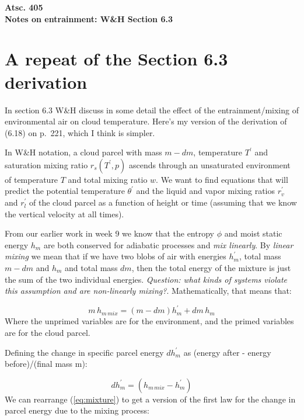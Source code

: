 \documentclass[12pt]{article}
\begin{document}
\begin{center}
{\bf
Atsc. 405\\
Notes on entrainment: W\&H Section 6.3\\
 }
\end{center}


\section{A repeat of the Section 6.3 derivation}
\label{sec:repeat-derivation}

In section 6.3 W\&H discuss in some detail the effect of the entrainment/mixing
of environmental air on cloud temperature.  Here's my version of the
derivation of (6.18) on p.~221, which I think is simpler.

In W\&H notation, a cloud parcel with mass $m - dm$, temperature $T^\prime$ and
saturation mixing ratio $r_s(T^\prime, p)$ ascends through an unsaturated environment 
of temperature $T$ and total mixing ratio $w$.  We want to find equations that
will predict the potential temperature $\theta^\prime$  and the liquid and vapor
mixing ratios $r_v^\prime$ and $r_l^\prime$ of the cloud parcel as a function of
height or time (assuming that we know the vertical velocity at all times).

From our earlier work in week 9 we know that the entropy $\phi$ and moist static energy
$h_m$ are both conserved for adiabatic processes and \textit{mix linearly}.  By 
\textit{linear mixing} we mean that if we have two blobs of air with
energies $h_m^\prime$, total mass $m-dm$ and  $h_m$ and total mass $dm$, then the
total energy of the mixture is just the sum of the two individual energies.
\textit{Question:  what kinds of systems violate this assumption and are non-linearly mixing?}.
Mathematically, that means that:

\begin{equation}
  \label{eq:mixture}
  m\,h_{m\,mix} = (m - dm) h_m^\prime + dm\,h_m
\end{equation}
Where the unprimed variables are for the environment, and the primed variables are for the cloud parcel.

Defining the change in specific parcel energy $dh_m^\prime$ as 
(energy after - energy before)/(final mass m):

\begin{equation}
  \label{eq:change}
  dh^\prime_{m} = (h_{m\,mix} - h_m^\prime)
\end{equation}
We can rearrange (\ref{eq:mixture}) to get a version of the first law for the
change in parcel energy due to the mixing process:
\end{document}

